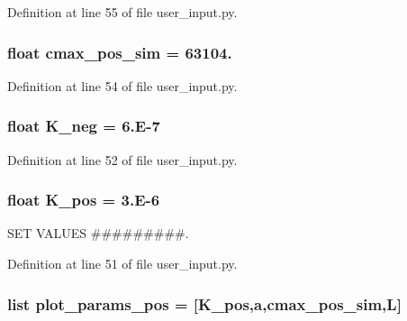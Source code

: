 Definition at line 55 of file user\-\_\-input.\-py.

\hypertarget{namespaceuser__input_aa5b015cc7d0bda453c6163023448db72}{
\subsubsection[{cmax\-\_\-pos\-\_\-sim}]{\setlength{\rightskip}{0pt plus 5cm}float cmax\-\_\-pos\-\_\-sim = 63104.}}\label{namespaceuser__input_aa5b015cc7d0bda453c6163023448db72}


Definition at line 54 of file user\-\_\-input.\-py.

\hypertarget{namespaceuser__input_a64d0c5854299798787675bc91586023c}{
\subsubsection[{K\-\_\-neg}]{\setlength{\rightskip}{0pt plus 5cm}float K\-\_\-neg = 6.\-E-\/7}}\label{namespaceuser__input_a64d0c5854299798787675bc91586023c}


Definition at line 52 of file user\-\_\-input.\-py.

\hypertarget{namespaceuser__input_ab1a8ebec490ba1301f818bd1c5f1f3fa}{
\subsubsection[{K\-\_\-pos}]{\setlength{\rightskip}{0pt plus 5cm}float K\-\_\-pos = 3.\-E-\/6}}\label{namespaceuser__input_ab1a8ebec490ba1301f818bd1c5f1f3fa}


S\-E\-T V\-A\-L\-U\-E\-S \#\#\#\#\#\#\#\#\#. 



Definition at line 51 of file user\-\_\-input.\-py.

\hypertarget{namespaceuser__input_a5bacef25baf63731923fbef674af4e9d}{
\subsubsection[{plot\-\_\-params\-\_\-pos}]{\setlength{\rightskip}{0pt plus 5cm}list plot\-\_\-params\-\_\-pos = \mbox{[}{\bf K\-\_\-pos},a,{\bf cmax\-\_\-pos\-\_\-sim},L\mbox{]}}}\label{namespaceuser__input_a5bacef25baf63731923fbef674af4e9d}


